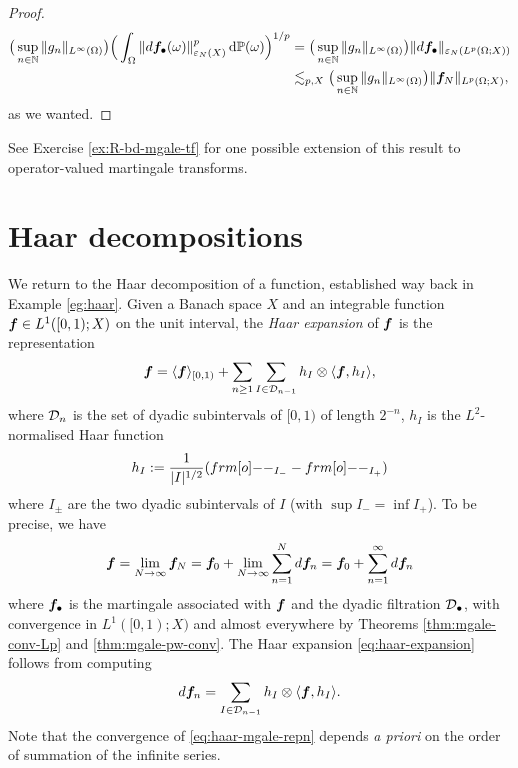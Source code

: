 \begin{proof}
\begin{equation*}
  \begin{aligned}
    \big( \sup_{n \in \mathbb{N}} \|g_{n}\|_{L^\infty(\Omega)} \big)  \Big( \int_{\Omega} \|d\bm{f}_{\bullet}(\omega)\|_{\varepsilon_{N}(X)}^{p} \, \mathrm{d}\mathbb{P}(\omega) \Big)^{1/p}
    &= \big( \sup_{n \in \mathbb{N}} \|g_{n}\|_{L^\infty(\Omega)} \big) \|d\bm{f}_{\bullet}\|_{\varepsilon_{N}(L^p(\Omega;X))} \\
    &\lesssim_{p,X} \big( \sup_{n \in \mathbb{N}} \|g_{n}\|_{L^\infty(\Omega)} \big) \|\bm{f}_{N}\|_{L^p(\Omega;X)},
  \end{aligned}
\end{equation*}
as we wanted.
\end{proof}

See Exercise \ref{ex:R-bd-mgale-tf} for one possible extension of this result to operator-valued martingale transforms.

\section{Haar decompositions}

We return to the Haar decomposition of a function, established way back in Example \ref{eg:haar}.
Given a Banach space $X$ and an integrable function $\bm{f} \in L^1([0,1);X)$ on the unit interval, the \emph{Haar expansion} of $\bm{f}$ is the representation
\begin{equation}\label{eq:haar-expansion}
  \bm{f} = \langle \bm{f} \rangle_{[0,1)} + \sum_{n \geq 1} \sum_{I \in \mathcal{D}_{n-1}} h_{I} \otimes \langle \bm{f}, h_{I} \rangle,
\end{equation}
where $\mathcal{D}_{n}$ is the set of dyadic subintervals of $[0,1)$ of length $2^{-n}$, $h_{I}$ is the $L^2$-normalised Haar function
\begin{equation*}
  h_{I} := \frac{1}{|I|^{1/2}} (\1_{I_{-}} - \1_{I_{+}})
\end{equation*}
where $I_{\pm}$ are the two dyadic subintervals of $I$ (with $\sup I_{-} = \inf I_{+}$).
To be precise, we have
\begin{equation}\label{eq:haar-mgale-repn}
  \bm{f} = \lim_{N \to \infty} \bm{f}_{N} =  \bm{f}_{0} + \lim_{N \to \infty} \sum_{n = 1}^{N} d\bm{f}_{n}
  = \bm{f}_{0} + \sum_{n = 1}^{\infty} d\bm{f}_{n}
\end{equation}
where $\bm{f}_{\bullet}$ is the martingale associated with $\bm{f}$ and the dyadic filtration $\mathcal{D}_{\bullet}$, with convergence in $L^1([0,1);X)$ and almost everywhere by Theorems \ref{thm:mgale-conv-Lp} and \ref{thm:mgale-pw-conv}.
The Haar expansion \eqref{eq:haar-expansion} follows from computing
\begin{equation*}
  d\bm{f}_{n} = \sum_{I \in \mathcal{D}_{n-1}} h_{I} \otimes \langle \bm{f}, h_{I} \rangle.
\end{equation*}
Note that the convergence of \eqref{eq:haar-mgale-repn} depends \emph{a priori} on the order of summation of the infinite series.

